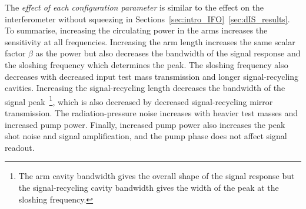 The \emph{effect of each configuration parameter} is similar to the effect on the interferometer without squeezing in Sections~\ref{sec:intro_IFO}~\ref{sec:dIS_results}. To summarise, increasing the circulating power in the arms increases the sensitivity at all frequencies. Increasing the arm length increases the same scalar factor $\beta$ as the power but also decreases the bandwidth of the signal response and the sloshing frequency which determines the peak. The sloshing frequency also decreases with decreased input test mass transmission and longer signal-recycling cavities. Increasing the signal-recycling length decreases the bandwidth of the signal peak~\footnote{The arm cavity bandwidth gives the overall shape of the signal response but the signal-recycling cavity bandwidth gives the width of the peak at the sloshing frequency.}, which is also decreased by decreased signal-recycling mirror transmission. The radiation-pressure noise increases with heavier test masses and increased pump power. Finally, increased pump power also increases the peak shot noise and signal amplification, and the pump phase does not affect signal readout.


\label{sec:nOPO_reduction}


